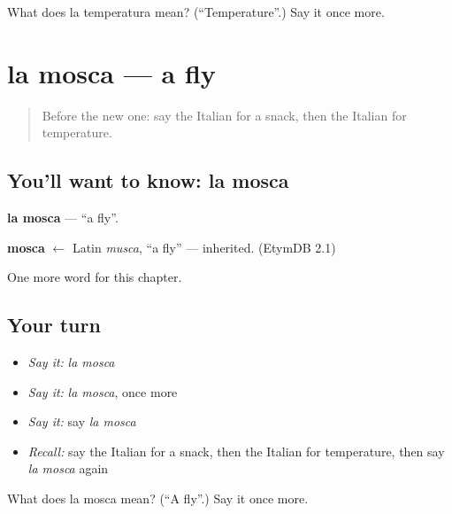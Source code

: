 \begin{tcolorbox}[breakable,colback=teal!4,colframe=teal!35!black,title={Before you move on}]
What does la temperatura mean? (\textquotedblleft{}Temperature\textquotedblright{}.) Say it once more.
\end{tcolorbox}
\section[la mosca]{la mosca — a fly}

\label{lesson:IT-C248-mosca}



\begin{quote}
Before the new one: say the Italian for a snack, then the Italian for temperature.
\end{quote}

\subsection*{You'll want to know: la mosca}
\textbf{la mosca} — \textquotedblleft{}a fly\textquotedblright{}.

\begin{cousinweb}
\textbf{mosca} $\leftarrow$ Latin \emph{musca}, \textquotedblleft{}a fly\textquotedblright{} — inherited. (EtymDB 2.1)
\end{cousinweb}

\begin{grammarlens}[title={What you've built}]
One more word for this chapter.
\end{grammarlens}

\subsection*{Your turn}
\begin{itemize}
\raggedright
  \item \emph{Say it:} \emph{la mosca}
  \item \emph{Say it:} \emph{la mosca}, once more
  \item \emph{Say it:} say \emph{la mosca}
  \item \emph{Recall:} say the Italian for a snack, then the Italian for temperature, then say \emph{la mosca} again
\end{itemize}

\begin{tcolorbox}[breakable,colback=teal!4,colframe=teal!35!black,title={Before you move on}]
What does la mosca mean? (\textquotedblleft{}A fly\textquotedblright{}.) Say it once more.
\end{tcolorbox}

